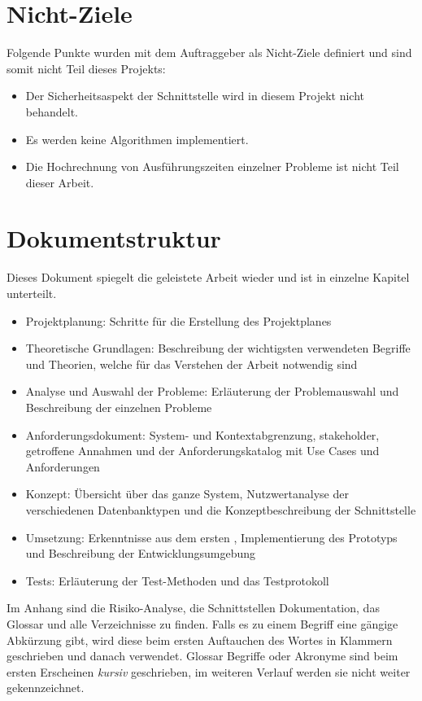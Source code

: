 \section{Nicht-Ziele}\label{nicht_ziele}
Folgende Punkte wurden mit dem Auftraggeber als Nicht-Ziele definiert und sind somit nicht Teil dieses Projekts:
\begin{itemize}
\item Der Sicherheitsaspekt der Schnittstelle wird in diesem Projekt nicht behandelt.
\item Es werden keine Algorithmen implementiert.
\item Die Hochrechnung von Ausführungszeiten einzelner Probleme ist nicht Teil dieser Arbeit.
\end{itemize}

\section{Dokumentstruktur}\label{document_structure}
Dieses Dokument spiegelt die geleistete Arbeit wieder und ist in einzelne Kapitel unterteilt.
\begin{itemize}
\item Projektplanung: Schritte für die Erstellung des Projektplanes
\item Theoretische Grundlagen: Beschreibung der wichtigsten verwendeten Begriffe und Theorien, welche für das Verstehen der Arbeit notwendig sind
\item Analyse und Auswahl der Probleme: Erläuterung der Problemauswahl und Beschreibung der einzelnen Probleme
\item Anforderungsdokument: System- und Kontextabgrenzung, \gls{stakeholder}, getroffene Annahmen und der Anforderungskatalog mit Use Cases und Anforderungen
\item Konzept: Übersicht über das ganze System, Nutzwertanalyse der verschiedenen Datenbanktypen und die Konzeptbeschreibung der Schnittstelle
\item Umsetzung: Erkenntnisse aus dem ersten , Implementierung des Prototyps und Beschreibung der Entwicklungsumgebung
\item Tests: Erläuterung der Test-Methoden und das Testprotokoll
\end{itemize}

Im Anhang sind die Risiko-Analyse, die Schnittstellen Dokumentation, das Glossar und alle Verzeichnisse zu finden. Falls es zu einem Begriff eine gängige Abkürzung gibt, wird diese beim ersten 
Auftauchen des Wortes in Klammern geschrieben und danach verwendet. Glossar Begriffe oder Akronyme sind beim ersten Erscheinen \textit{kursiv} geschrieben, im weiteren Verlauf werden 
sie nicht weiter gekennzeichnet.